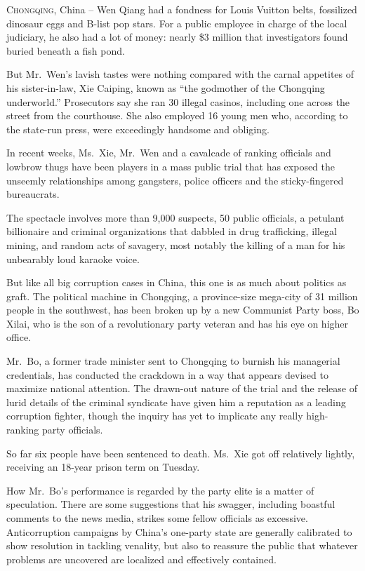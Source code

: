 ﻿\documentclass[12pt]{article}
\begin{document}
\lettrine{C}{hongqing}, China -- Wen Qiang had a fondness for Louis Vuitton
belts, fossilized dinosaur eggs and B-list pop stars. For a public employee in charge of the local
judiciary, he also had a lot of money: nearly \$3 million that investigators found buried beneath a
fish pond.

But Mr.~Wen's lavish tastes were nothing compared with the carnal\cite{carnal} appetites of his
sister-in-law, Xie Caiping, known as ``the godmother of the Chongqing underworld.'' Prosecutors say
she ran 30 illegal casinos, including one across the street from the courthouse. She also employed
16 young men who, according to the state-run press, were exceedingly handsome and obliging.

In recent weeks, Ms.~Xie, Mr.~Wen and a cavalcade of ranking officials and lowbrow thugs\cite{thug}
have been players in a mass public trial that has exposed the unseemly relationships among
gangsters, police officers and the sticky-fingered bureaucrats.

The spectacle involves more than 9,000 suspects, 50 public officials, a petulant billionaire and
criminal organizations that dabbled in drug trafficking, illegal mining, and random acts of
savagery, most notably the killing of a man for his unbearably loud karaoke voice.

But like all big corruption cases in China, this one is as much about politics as graft. The
political machine in Chongqing, a province-size mega-city of 31 million people in the southwest, has
been broken up by a new Communist Party boss, Bo Xilai, who is the son of a revolutionary party
veteran and has his eye on higher office.

Mr.~Bo, a former trade minister sent to Chongqing to burnish his managerial credentials, has
conducted the crackdown in a way that appears devised to maximize national attention. The drawn-out
nature of the trial and the release of lurid details of the criminal syndicate have given him a
reputation as a leading corruption fighter, though the inquiry has yet to implicate any really
high-ranking party officials.

So far six people have been sentenced to death. Ms.~Xie got off relatively lightly, receiving an
18-year prison term on Tuesday.

How Mr.~Bo's performance is regarded by the party elite is a matter of speculation. There are some
suggestions that his swagger\cite{swagger}, including boastful comments to the news media, strikes
some fellow officials as excessive. Anticorruption campaigns by China's one-party state are
generally calibrated to show resolution in tackling venality, but also to reassure the public that
whatever problems are uncovered are localized and effectively contained.
\end{document}
